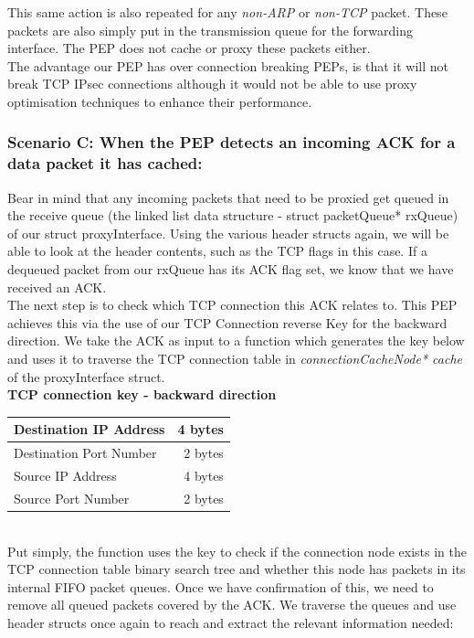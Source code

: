 \documentclass{uathesis}
\begin{document}
This same action is also repeated for any \emph{non-ARP} or \emph{non-TCP} packet. These packets are also simply put in the transmission queue for the forwarding interface. The PEP does not cache or proxy these packets either.\\

The advantage our PEP has over connection breaking PEPs, is that it will not break TCP IPsec connections although it would not be able to use proxy optimisation techniques to enhance their performance.

\subsubsection{Scenario C: When the PEP detects an incoming ACK for a data packet it has cached:}

Bear in mind that any incoming packets that need to be proxied get queued in the receive queue (the linked list data structure - struct packetQueue* rxQueue) of our struct proxyInterface. Using the various header structs again, we will be able to look at the header contents, such as the TCP flags in this case. If a dequeued packet from our rxQueue has its ACK flag set, we know that we have received an ACK. \\

The next step is to check which TCP connection this ACK relates to. This PEP achieves this via the use of our TCP Connection reverse Key for the backward direction. We take the ACK as input to a function which generates the key below and uses it to traverse the TCP connection table in \emph{connectionCacheNode* cache} of the proxyInterface struct. \\

\textbf{TCP connection key - backward direction} \\

\begin{tabular}{|l|r|}
	\hline
    Destination IP Address & 4 bytes\\
	\hline
    Destination Port Number & 2 bytes\\
    \hline 
    Source IP Address & 4 bytes\\
	\hline
    Source Port Number & 2 bytes\\
	\hline
\end{tabular} \\

Put simply, the function uses the key to check if the connection node exists in the TCP connection table binary search tree and whether this node has packets in its internal FIFO packet queues. Once we have confirmation of this, we need to remove all queued packets covered by the ACK. We traverse the queues and use header structs once again to reach and extract the relevant information needed:\\
\end{document}
